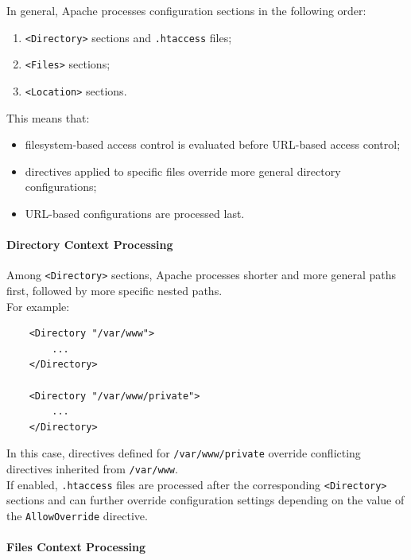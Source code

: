 \documentclass{scrbook}
\begin{document}
	In general, Apache processes configuration sections in the following order:
	
	\begin{enumerate}
		\item \texttt{<Directory>} sections and \texttt{.htaccess} files;
		
		\item \texttt{<Files>} sections;
		
		\item \texttt{<Location>} sections.
	\end{enumerate}
	
	This means that:
	\begin{itemize}
		\item filesystem-based access control is evaluated before URL-based access control;
		
		\item directives applied to specific files override more general directory configurations;
		
		\item URL-based configurations are processed last.
	\end{itemize}
	
	\paragraph{Directory Context Processing}
	
	Among \texttt{<Directory>} sections, Apache processes shorter and more general paths first, followed by more specific nested paths.\\
	
	For example:
	
	\begin{lstlisting}
	<Directory "/var/www">
		...
	</Directory>
		
	<Directory "/var/www/private">
		...
	</Directory>
	\end{lstlisting}
	
	In this case, directives defined for \texttt{/var/www/private} override conflicting directives inherited from \texttt{/var/www}.\\
	
	If enabled, \texttt{.htaccess} files are processed after the corresponding \texttt{<Directory>} sections and can further override configuration settings depending on the value of the \texttt{AllowOverride} directive.
	
	\paragraph{Files Context Processing}
	
\end{document}
